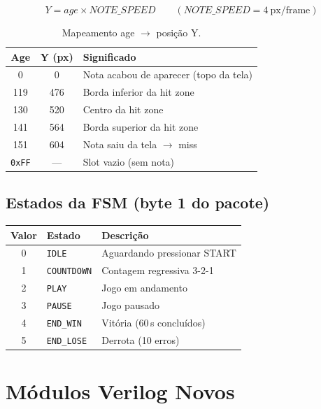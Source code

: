 \documentclass[12pt,a4paper]{article}
\begin{document}
\begin{equation}
    Y = \mathit{age} \times \mathit{NOTE\_SPEED} \qquad (\mathit{NOTE\_SPEED} = 4\ \text{px/frame})
\end{equation}

\begin{table}[H]
\centering
\begin{tabular}{ccl}
\toprule
\textbf{Age} & \textbf{Y (px)} & \textbf{Significado} \\
\midrule
0   & 0   & Nota acabou de aparecer (topo da tela) \\
119 & 476 & Borda inferior da hit zone \\
130 & 520 & Centro da hit zone \\
141 & 564 & Borda superior da hit zone \\
151 & 604 & Nota saiu da tela $\rightarrow$ miss \\
\texttt{0xFF} & --- & Slot vazio (sem nota) \\
\bottomrule
\end{tabular}
\caption{Mapeamento age $\rightarrow$ posição Y.}
\end{table}

\subsection{Estados da FSM (byte 1 do pacote)}

\begin{center}
\begin{tabular}{cll}
\toprule
\textbf{Valor} & \textbf{Estado} & \textbf{Descrição} \\
\midrule
0 & \texttt{IDLE}      & Aguardando pressionar START \\
1 & \texttt{COUNTDOWN} & Contagem regressiva 3-2-1 \\
2 & \texttt{PLAY}      & Jogo em andamento \\
3 & \texttt{PAUSE}     & Jogo pausado \\
4 & \texttt{END\_WIN}  & Vitória (60\,s concluídos) \\
5 & \texttt{END\_LOSE} & Derrota (10 erros) \\
\bottomrule
\end{tabular}
\end{center}

\section{Módulos Verilog Novos}
\end{document}
